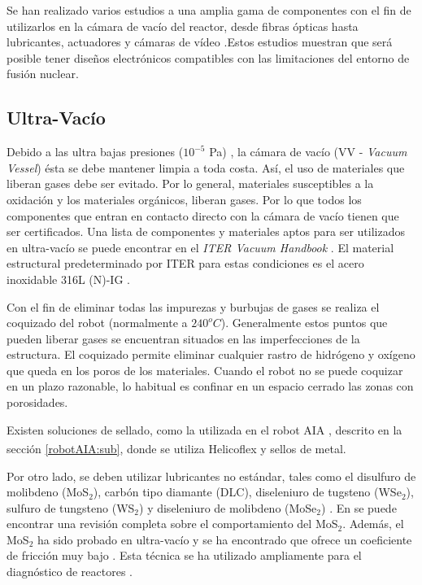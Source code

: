 Se han realizado varios estudios a una amplia gama de componentes con el fin de utilizarlos en la cámara de vacío del reactor, desde fibras ópticas hasta lubricantes, actuadores y cámaras de vídeo \cite{VanUffelen2005, Leroux2006, Bock2008}.Estos estudios muestran que ser\'a posible tener diseños electrónicos compatibles con las limitaciones del entorno de fusión nuclear.

\subsection*{Ultra-Vacío}
Debido a las ultra bajas presiones ($10^{-5} $ Pa) \cite {ITEROrg.2004}, la cámara de vacío (VV - \textit{Vacuum Vessel})  \'esta se debe mantener limpia a toda costa. As\'i, el uso de materiales que liberan gases debe ser evitado. Por lo general, materiales susceptibles a la oxidación y los materiales orgánicos, liberan gases. Por lo que todos los componentes que entran en contacto directo con la cámara de vacío tienen que ser certificados. Una lista de componentes y materiales aptos para ser utilizados en ultra-vacío se puede encontrar en el \textit{ITER Vacuum Handbook} \cite{L.Worth2009}.
El material estructural predeterminado por ITER para estas condiciones es el acero inoxidable 316L (N)-IG \cite{Aiello2011}.

Con el fin de eliminar todas las impurezas y burbujas de gases se realiza el coquizado del robot (normalmente a $240^{o}C $). Generalmente estos puntos que pueden liberar gases se encuentran situados en las imperfecciones de la estructura. El coquizado permite eliminar cualquier rastro de hidrógeno y oxígeno que queda en los poros de los materiales.
Cuando el robot no se puede coquizar en un plazo razonable, lo habitual es confinar en un espacio cerrado las zonas con porosidades.


Existen soluciones de sellado, como la utilizada en el robot AIA \cite{Keller2009}, descrito en la secci\'on \ref{robotAIA:sub}, donde se utiliza Helicoflex\textsuperscript{\textregistered} y sellos de metal.

Por otro lado, se deben utilizar lubricantes no estándar, tales como el disulfuro de molibdeno (MoS$ _ {2} $), carbón tipo diamante (DLC), diseleniuro de tugsteno (WSe$ _ {2} $), sulfuro de tungsteno (WS$ _{2} $) y diseleniuro de molibdeno (MoSe$ _ {2} $) \cite{ogawa2008research}.
En \cite{winer1967molybdenum} se puede encontrar una revisión completa sobre el comportamiento del MoS$ _ {2} $.
Además, el MoS$ _ {2}$ ha sido probado en ultra-vacío y se ha encontrado que ofrece un coeficiente de fricción muy bajo \cite{cizaire2002mechanisms}.
Esta técnica se ha utilizado ampliamente para el diagnóstico de reactores \cite{ogawa2008research}.

